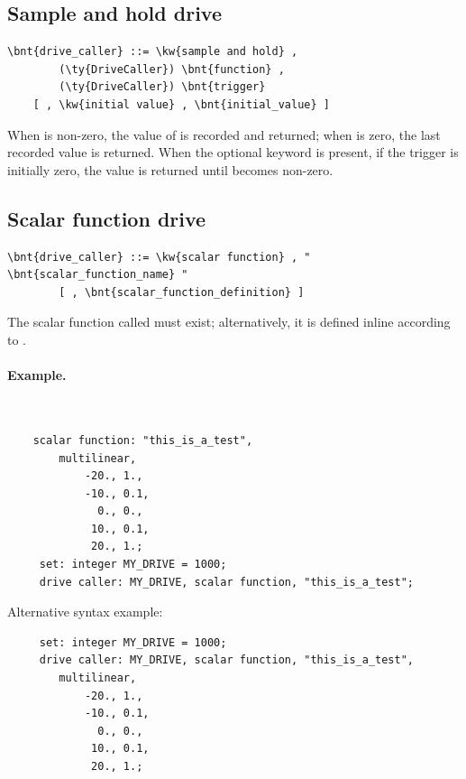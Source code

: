 \subsection{Sample and hold drive}
\begin{Verbatim}[commandchars=\\\{\}]
    \bnt{drive_caller} ::= \kw{sample and hold} ,
        (\ty{DriveCaller}) \bnt{function} ,
        (\ty{DriveCaller}) \bnt{trigger}
	[ , \kw{initial value} , \bnt{initial_value} ]
\end{Verbatim}
When  is non-zero, the value of 
is recorded and returned; when  is zero,
the last recorded value is returned.
When the optional keyword  is present,
if the trigger is initially zero, the value 
is returned until  becomes non-zero.

\subsection{Scalar function drive}
\begin{Verbatim}[commandchars=\\\{\}]
    \bnt{drive_caller} ::= \kw{scalar function} , " \bnt{scalar_function_name} "
        [ , \bnt{scalar_function_definition} ]
\end{Verbatim}
The scalar function called  must exist;
alternatively, it is defined inline according to
.

\paragraph{Example.} \
\begin{verbatim}
    scalar function: "this_is_a_test",
        multilinear,
            -20., 1.,
            -10., 0.1,
              0., 0.,
             10., 0.1,
             20., 1.;
     set: integer MY_DRIVE = 1000;
     drive caller: MY_DRIVE, scalar function, "this_is_a_test";
\end{verbatim}
Alternative syntax example:
\begin{verbatim}
     set: integer MY_DRIVE = 1000;
     drive caller: MY_DRIVE, scalar function, "this_is_a_test",
        multilinear,
            -20., 1.,
            -10., 0.1,
              0., 0.,
             10., 0.1,
             20., 1.;
\end{verbatim}


